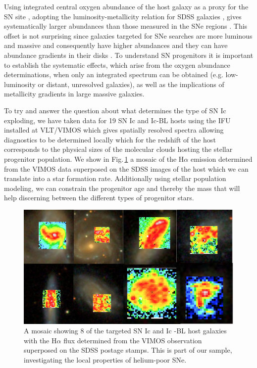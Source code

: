Using integrated central oxygen abundance of the host
galaxy as a proxy for the
SN site \citep{Prieto2008, Kelly2012}, adopting the
luminosity-metallicity
relation for SDSS galaxies \citep{Tremonti2004}, gives
systematically larger
abundances than those measured in the SNe regions \citep{Modjaz2011}.
This
offset is not surprising since galaxies targeted for SNe searches
are more
luminous and massive and consequently have higher abundances
and they can have
abundance gradients in their disks \citep{Sanders2012}.
To understand SN progenitors it is important to establish
the
systematic effects, which arise from the oxygen abundance
determinations,
when only an integrated spectrum can be obtained
(e.g. low-luminosity or
distant, unresolved galaxies), as well as the
implications of metallicity
gradients in large massive galaxies.

To try and answer the question about what determines the type of SN Ic
exploding, we have taken data for 19 SN Ic and Ic-BL hosts using the IFU
installed at VLT/VIMOS which gives spatially resolved spectra allowing
diagnostics
to be determined locally which for the redshift of the host
corresponds to the
physical sizes of the molecular clouds hosting the stellar
progenitor
population. We show in Fig.\,\ref{fig:intro:snifu} a mosaic of the
H$\alpha$
emission determined from the VIMOS data superposed on the SDSS images
of the
host which we can translate into a star formation rate. Additionally
using
stellar population modeling, we can constrain the progenitor age and
thereby the
mass that will help discerning between the different types of
progenitor stars. 



\begin{figure}[htb]
	
	\includegraphics[width=\textwidth]{gfx/ifu}
	
	\caption{A mosaic showing 8 of the targeted SN Ic and Ic -BL host galaxies with the H$\alpha$ flux determined from the VIMOS observation superposed on the SDSS postage stamps. This is part of our sample, investigating the local properties of helium-poor SNe. }
	
	\label{fig:intro:snifu}
\end{figure}


